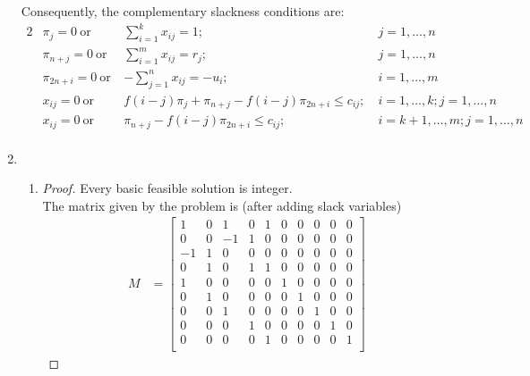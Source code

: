 \documentclass[12pt]{article}
\begin{document}
\begin{enumerate}
    Consequently, the complementary slackness conditions are:
    \begin{alignat*}{2}
      &\pi_j=0\ \text{or}\ 
        &\sum_{i=1}^kx_{ij}=1;\ &j=1,\ldots,n\\
      &\pi_{n+j}=0\ \text{or}\
        &\sum_{i=1}^mx_{ij}= r_j;\ &j=1,\ldots,n\\
      &\pi_{2n+i}=0\ \text{or}\
        &-\sum_{j=1}^nx_{ij}=-u_i;\quad&i=1,\ldots,m\\
      &x_{ij}=0\ \text{or}\
        &f(i-j)\pi_j+\pi_{n+j}-f(i-j)\pi_{2n+i}\leq c_{ij};\
        &i=1,\ldots,k;j=1,\ldots,n\\
      &x_{ij}=0\ \text{or}\
        &\pi_{n+j}-f(i-j)\pi_{2n+i}\leq c_{ij};\
        &i=k+1,\ldots,m;j=1,\ldots,n\\
    \end{alignat*}
  \item
    \begin{enumerate}
      \item
        \begin{proof} Every basic feasible solution is integer.\\
          The matrix given by the problem is (after adding slack variables)\\
          \begin{align*}
            M &=
            \begin{bmatrix*}
              1 & 0 & 1 & 0 & 1 & 0 & 0 & 0 & 0 & 0\\
              0 & 0 & -1 & 1 & 0 & 0 & 0 & 0 & 0 & 0\\
              -1 & 1 & 0 & 0 & 0 & 0 & 0 & 0 & 0 & 0\\
              0 & 1 & 0 & 1 & 1 & 0 & 0 & 0 & 0 & 0\\
              1 & 0 & 0 & 0 & 0 & 1 & 0 & 0 & 0 & 0\\
              0 & 1 & 0 & 0 & 0 & 0 & 1 & 0 & 0 & 0\\
              0 & 0 & 1 & 0 & 0 & 0 & 0 & 1 & 0 & 0\\
              0 & 0 & 0 & 1 & 0 & 0 & 0 & 0 & 1 & 0\\
              0 & 0 & 0 & 0 & 1 & 0 & 0 & 0 & 0 & 1\\
            \end{bmatrix*}
          \end{align*}


\end{proof}
\end{enumerate}
\end{enumerate}
\end{document}
